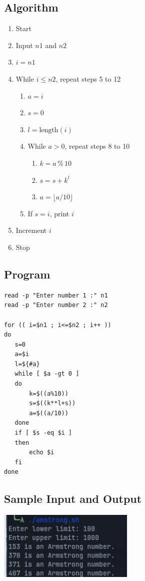 \subsection{Algorithm}
\begin{enumerate}
   \item Start
   \item Input $n1$ and $n2$
   \item $i = n1$
   \item While $i \leq n2$, repeat steps 5 to 12
       \begin{enumerate}
           \item $a = i$
           \item $s = 0$
           \item $l = \text{length}(i)$
           \item While $a > 0$, repeat steps 8 to 10
               \begin{enumerate}
                   \item $k = a \, \% \, 10$
                   \item $s = s + k^l$
                   \item $a = \lfloor a / 10 \rfloor$
               \end{enumerate}
           \item If $s = i$, print $i$
       \end{enumerate}
   \item Increment $i$
   \item Stop
\end{enumerate}


\subsection{Program}
\begin{lstlisting}[label={list:program:armstrong_numbers}]
read -p "Enter number 1 :" n1
read -p "Enter number 2 :" n2

for (( i=$n1 ; i<=$n2 ; i++ ))
do
   s=0
   a=$i
   l=${#a}
   while [ $a -gt 0 ]
   do
       k=$((a%10))
       s=$((k**l+s))
       a=$((a/10))
   done
   if [ $s -eq $i ]
   then
       echo $i
   fi
done
\end{lstlisting}

\subsection{Sample Input and Output}
 \includegraphics[]{Cycle_1//Outputs/amstrong.png}


